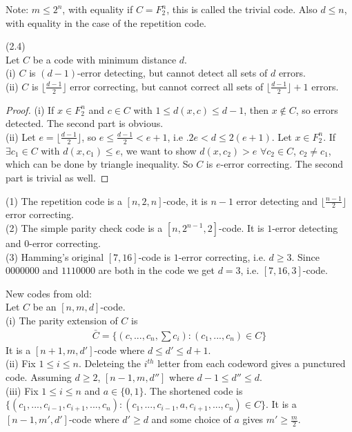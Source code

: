 \documentclass[a4paper]{article}
\begin{document}
Note: $m \leq 2^n$, with equality if $C=F_2^n$, this is called the trivial code. Also $d \leq n$, with equality in the case of the repetition code.

\begin{lemma} (2.4)\\
Let $C$ be a code with minimum distance $d$.\\
(i) $C$ is $(d-1)$-error detecting, but cannot detect all sets of $d$ errors.\\
(ii) $C$ is $\lfloor \frac{d-1}{2}\rfloor$ error correcting, but cannot correct all sets of $\lfloor \frac{d-1}{2}\rfloor+1$ errors.
\begin{proof}
(i) If $x \in F_2^n$ and $c \in C$ with $1 \leq d(x,c) \leq d-1$, then $x \not\in C$, so errors detected. The second part is obvious.\\
(ii) Let $e = \lfloor \frac{d-1}{2}\rfloor$, so $e \leq \frac{d-1}{2} < e+1$, i.e .$2e < d \leq 2(e+1)$. Let $x \in F_2^n$. If $\exists c_1 \in C$ with $d(x,c_1) \leq e$, we want to show $d(x,c_2)>e$ $\forall c_2 \in C$, $c_2 \neq c_1$, which can be done by triangle inequality. So $C$ is $e$-error correcting. The second part is trivial as well.
\end{proof}
\end{lemma}

\begin{eg}
(1) The repetition code is a $[n,2,n]$-code, it is $n-1$ error detecting and $\lfloor \frac{n-1}{2}\rfloor$ error correcting.\\
(2) The simple parity check code is a $[n,2^{n-1},2]$-code. It is $1$-error detecting and $0$-error correcting.\\
(3) Hamming's original $[7,16]$-code is $1$-error correcting, i.e. $d \geq 3$. Since $0000000$ and $1110000$ are both in the code we get $d=3$, i.e. $[7,16,3]$-code.
\end{eg}

New codes from old:\\
Let $C$ be an $[n,m,d]$-code.\\
(i) The parity extension of $C$ is 
\begin{equation*}
\begin{aligned}
\bar{C} =\{(c,...,c_n,\sum c_i): (c_1,...,c_n) \in C\}
\end{aligned}
\end{equation*}
It is a $[n+1,m,d']$-code where $d \leq d' \leq d+1$.\\
(ii) Fix $1 \leq i \leq n$. Deleteing the $i^{th}$ letter from each codeword gives a punctured code. Assuming $d \geq 2$, $[n-1,m,d'']$ where $d-1 \leq d'' \leq d$.\\
(iii) Fix $1 \leq i \leq n$ and $a \in \{0,1\}$. The shortened code is $\{(c_1,...,c_{i-1},c_{i+1},...,c_n): (c_1,...,c_{i-1},a,c_{i+1},...,c_n) \in C\}$. It is a $[n-1,m',d']$-code where $d' \geq d$ and some choice of $a$ gives $m' \geq \frac{m}{2}$.
\end{document}
